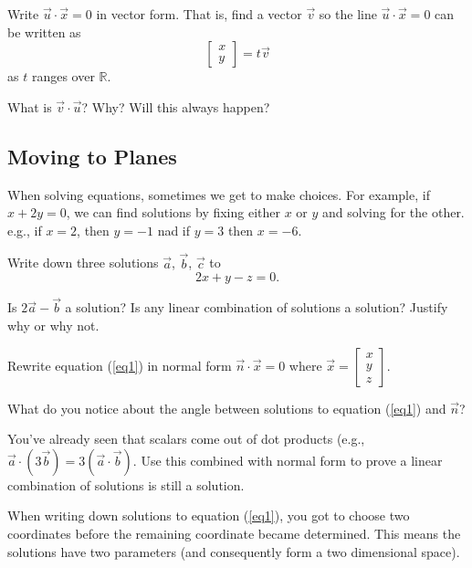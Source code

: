 \documentclass{article}
\newcommand{\R}{\mathbb{R}}
\begin{document}
	\begin{Enum}
		\item Write $\vec u\cdot \vec x=0$ in vector form.  That is, find a vector $\vec v$ so
		the line $\vec u\cdot \vec x=0$  can be written as
		\[
			\begin{bmatrix}x\\y\end{bmatrix} = t\vec v
		\]
		as $t$ ranges over $\R$.
		\item What is $\vec v\cdot \vec u$? Why? Will this always happen?
	\end{Enum}

	\subsection*{Moving to Planes}
	When solving equations, sometimes we get to make choices. For example, 
	if $x+2y=0$, we can find solutions by fixing either $x$ or $y$ and solving
	for the other. e.g., if $x=2$, then $y=-1$ nad if $y=3$ then $x=-6$.

	\begin{Enum}
		\item Write down three solutions $\vec a$, $\vec b$, $\vec c$ to
		\begin{equation}\label{eq1}
			2x+y-z=0.
		\end{equation}
		\item Is $2\vec a-\vec b$ a solution?  Is any linear combination of solutions a solution?  Justify why or why not.
		\item Rewrite equation (\ref{eq1}) in normal form $\vec n\cdot \vec x=0$ where $\vec x=\begin{bmatrix}x\\ y\\ z\end{bmatrix}$.
		\item What do you notice about the angle between solutions to equation (\ref{eq1}) and $\vec n$?
		\item You've already seen that scalars come out of dot products (e.g., $\vec a\cdot(3\vec b) = 3(\vec a\cdot \vec b)$.
		Use this combined with normal form to prove a linear combination of solutions is still a solution.
	\end{Enum}

	When writing down solutions to equation (\ref{eq1}), you got to choose two coordinates before the remaining
	coordinate became determined.  This means the solutions have two parameters (and consequently form a
	two dimensional space).
\end{document}
